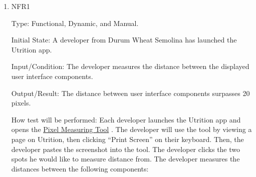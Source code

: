 \documentclass[12pt, titlepage]{article}
\begin{document}
	\begin{enumerate}
		\item{NFR1\\} 
		
		Type: Functional, Dynamic, and Manual.
		
		Initial State: A developer from Durum Wheat Semolina has launched the Utrition app.
		
		Input/Condition: The developer measures the distance between the displayed user interface components.
		
		Output/Result: The distance between user interface components surpasses 20 pixels.
		
		How test will be performed: Each developer launches the Utrition app and opens the \href{https://www.rapidtables.com/web/tools/pixel-ruler.html}{Pixel Measuring Tool} . The developer will use the tool by viewing a page on Utrition, then clicking “Print Screen'' on their keyboard. Then, the developer pastes the screenshot into the tool. The developer clicks the two spots he would like to measure distance from. The developer measures the distances between the following components:	
		

\end{enumerate}
\end{document}
